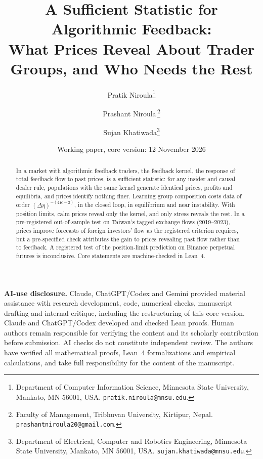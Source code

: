 \title{A Sufficient Statistic for Algorithmic Feedback:\\ What Prices Reveal About Trader Groups, and Who Needs the Rest}
\author{Pratik Niroula\thanks{Department of Computer Information Science, Minnesota State University, Mankato, MN 56001, USA. \texttt{pratik.niroula@mnsu.edu}.}
\and Prashant Niroula\,\thanks{Faculty of Management, Tribhuvan University, Kirtipur, Nepal. \texttt{prashantniroula20@gmail.com}.}
\and Sujan Khatiwada\thanks{Department of Electrical, Computer and Robotics Engineering, Minnesota State University, Mankato, MN 56001, USA. \texttt{sujan.khatiwada@mnsu.edu}.}}
\date{Working paper, core version: 12 November 2026}

\usepackage{array}
\makeatletter\g@addto@macro\UrlBreaks{\do\_}\makeatother

\maketitle
\thispagestyle{empty}\pagestyle{empty}
\begingroup\onehalfspacing

\begin{abstract}
\noindent In a market with algorithmic feedback traders, the feedback kernel, the response of total feedback flow to past prices, is a sufficient statistic: for any insider and causal dealer rule, populations with the same kernel generate identical prices, profits and equilibria, and prices identify nothing finer. Learning group composition costs data of order $(\Delta\eta)^{-(4K-2)}$, in the closed loop, in equilibrium and near instability. With position limits, calm prices reveal only the kernel, and only stress reveals the rest. In a pre-registered out-of-sample test on Taiwan's tagged exchange flows (2019--2023), prices improve forecasts of foreign investors' flow as the registered criterion requires, but a pre-specified check attributes the gain to prices revealing past flow rather than to feedback. A registered test of the position-limit prediction on Binance perpetual futures is inconclusive. Core statements are machine-checked in Lean~4.
\end{abstract}

\noindent\textbf{AI-use disclosure.} Claude, ChatGPT/Codex and Gemini provided material assistance with research development, code, numerical checks, manuscript drafting and internal critique, including the restructuring of this core version. Claude and ChatGPT/Codex developed and checked Lean proofs. Human authors remain responsible for verifying the content and its scholarly contribution before submission. AI checks do not constitute independent review. The authors have verified all mathematical proofs, Lean~4 formalizations and empirical calculations, and take full responsibility for the content of the manuscript.

